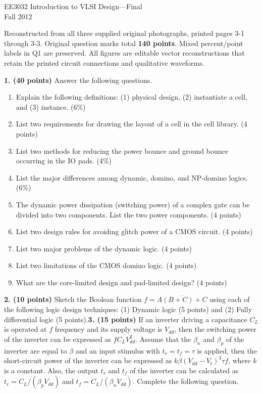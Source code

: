 \documentclass[10pt]{article}
\begin{document}
\begin{center}{\Large EE3032 Introduction to VLSI Design---Final}\\Fall 2012\end{center}
Reconstructed from all three supplied original photographs, printed pages 3-1 through 3-3. Original question marks total \textbf{140 points}. Mixed percent/point labels in Q1 are preserved. All figures are editable vector reconstructions that retain the printed circuit connections and qualitative waveforms.\par\medskip
\textbf{1. (40 points)} Answer the following questions.
\begin{enumerate}[label=(\alph*)]
\item Explain the following definitions: (1) physical design, (2) instantiate a cell, and (3) instance. (6\%)
\item List two requirements for drawing the layout of a cell in the cell library. (4 points)
\item List two methods for reducing the power bounce and ground bounce occurring in the IO pads. (4\%)
\item List the major differences among dynamic, domino, and NP-domino logics. (6\%)
\item The dynamic power dissipation (switching power) of a complex gate can be divided into two components. List the two power components. (4 points)
\item List two design rules for avoiding glitch power of a CMOS circuit. (4 points)
\item List two major problems of the dynamic logic. (4 points)
\item List two limitations of the CMOS domino logic. (4 points)
\item What are the core-limited design and pad-limited design? (4 points)
\end{enumerate}\textbf{2. (10 points)} Sketch the Boolean function $f=\overline{A(B+C)+C}$ using each of the following logic design techniques: (1) Dynamic logic (5 points) and (2) Fully differential logic (5 points).\newpage\textbf{3. (15 points)} If an inverter driving a capacitance $C_L$ is operated at $f$ frequency and its supply voltage is $V_{dd}$, then the switching power of the inverter can be expressed as $fC_LV_{dd}^2$. Assume that the $\beta_n$ and $\beta_p$ of the inverter are equal to $\beta$ and an input stimulus with $t_r=t_f=\tau$ is applied, then the short-circuit power of the inverter can be expressed as $k\beta(V_{dd}-V_t)^3\tau f$, where $k$ is a constant. Also, the output $t_r$ and $t_f$ of the inverter can be calculated as $t_r=C_L/(\beta_pV_{dd})$ and $t_f=C_L/(\beta_nV_{dd})$. Complete the following question.
\end{document}
